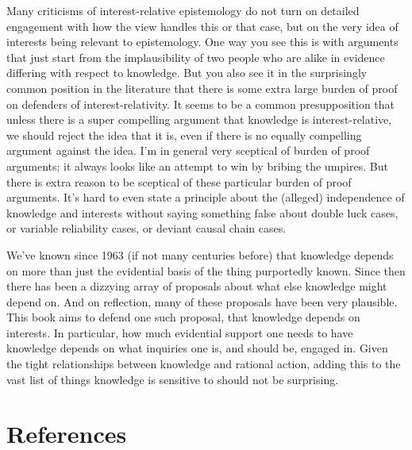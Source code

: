 \documentclass[
  10pt,
  letterpaper,
  twoside]{scrbook}
\begin{document}
Many criticisms of interest-relative epistemology do not turn on
detailed engagement with how the view handles this or that case, but on
the very idea of interests being relevant to epistemology. One way you
see this is with arguments that just start from the implausibility of
two people who are alike in evidence differing with respect to
knowledge. But you also see it in the surprisingly common position in
the literature that there is some extra large burden of proof on
defenders of interest-relativity. It seems to be a common presupposition
that unless there is a super compelling argument that knowledge is
interest-relative, we should reject the idea that it is, even if there
is no equally compelling argument against the idea. I'm in general very
sceptical of burden of proof arguments; it always looks like an attempt
to win by bribing the umpires. But there is extra reason to be sceptical
of these particular burden of proof arguments. It's hard to even state a
principle about the (alleged) independence of knowledge and interests
without saying something false about double luck cases, or variable
reliability cases, or deviant causal chain cases.

We've known since 1963 (if not many centuries before) that knowledge
depends on more than just the evidential basis of the thing purportedly
known. Since then there has been a dizzying array of proposals about
what else knowledge might depend on. And on reflection, many of these
proposals have been very plausible. This book aims to defend one such
proposal, that knowledge depends on interests. In particular, how much
evidential support one needs to have knowledge depends on what inquiries
one is, and should be, engaged in. Given the tight relationships between
knowledge and rational action, adding this to the vast list of things
knowledge is sensitive to should not be surprising.


\chapter*{References}\label{references}

\end{document}
